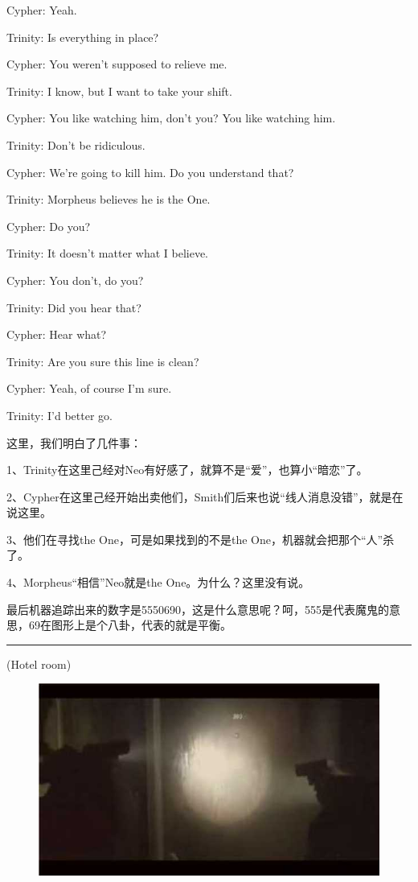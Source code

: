 \documentclass[UTF8]{ctexart}
\newcommand{\myparsep}{\noindent \rule[0.5ex]{\linewidth}{1pt}}
\newenvironment{myquote}{\color{green} \setlength{\leftskip}{6em} \setlength{\rightskip}{4em} \setlength{\parindent}{-2em}}{\par}
\begin{document}
\begin{myquote}
Cypher: Yeah.

Trinity: Is everything in place?

Cypher: You weren't supposed to relieve me.

Trinity: I know, but I want to take your shift.

Cypher: You like watching him, don't you? You like watching him.

Trinity: Don't be ridiculous.

Cypher: We're going to kill him. Do you understand that?

Trinity: Morpheus believes he is the One.

Cypher: Do you?

Trinity: It doesn't matter what I believe.

Cypher: You don't, do you?

Trinity: Did you hear that?

Cypher: Hear what?

Trinity: Are you sure this line is clean?

Cypher: Yeah, of course I'm sure.

Trinity: I'd better go.
\end{myquote}

这里，我们明白了几件事：

1、Trinity在这里己经对Neo有好感了，就算不是“爱”，也算小“暗恋”了。

2、Cypher在这里己经开始出卖他们，Smith们后来也说“线人消息没错”，就是在说这里。

3、他们在寻找the One，可是如果找到的不是the One，机器就会把那个“人”杀了。

4、Morpheus“相信”Neo就是the One。为什么？这里没有说。

最后机器追踪出来的数字是5550690，这是什么意思呢？呵，555是代表魔鬼的意思，69在图形上是个八卦，代表的就是平衡。

\myparsep

\begin{myquote}
(Hotel room)
\end{myquote}

\begin{figure}[htb]
\centering
\includegraphics[width=0.5\linewidth]{fig/read_Matrix-1}
\end{figure}
\end{document}
